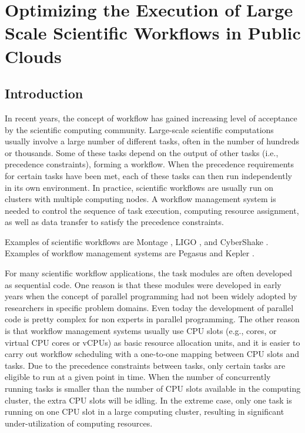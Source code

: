\chapter{Optimizing the Execution of Large Scale Scientific Workflows in Public Clouds}
\label{chapter:dewe_v1}

\section{Introduction}
\label{sec:dewe_v1:dewe_v1_intro}

In recent years, the concept of workflow has gained increasing level of acceptance by the scientific computing community. Large-scale scientific computations usually involve a large number of different tasks, often in the number of hundreds or thousands. Some of these tasks depend on the output of other tasks (i.e., precedence constraints), forming a workflow. When the precedence requirements for certain tasks have been met, each of these tasks can then run independently in its own environment. In practice, scientific workflows are usually run on clusters with multiple computing nodes. A workflow management system is needed to control the sequence of task execution, computing resource assignment, as well as data transfer to satisfy the precedence constraints. 

Examples of scientific workflows are Montage \cite{montage, web:montage}, LIGO \cite{ligo}, and CyberShake \cite{cybershake}. Examples of workflow management systems are Pegasus \cite{deelman2004pegasus} and Kepler \cite{altintas2004kepler}.

For many scientific workflow applications, the task modules are often developed as sequential code. One reason is that these modules were developed in early years when the concept of parallel programming had not been widely adopted by researchers in specific problem domains. Even today the development of parallel code is pretty complex for non experts in parallel programming. The other reason is that workflow management systems usually use CPU slots (e.g., cores, or virtual CPU cores or vCPUs) as basic resource allocation units, and it is easier to carry out workflow scheduling with a one-to-one mapping between CPU slots and tasks. Due to the precedence constraints between tasks, only certain tasks are eligible to run at a given point in time. When the number of concurrently running tasks is smaller than the number of CPU slots available in the computing cluster, the extra CPU slots will be idling. In the extreme case, only one task is running on one CPU slot in a large computing cluster, resulting in significant under-utilization of computing resources.

